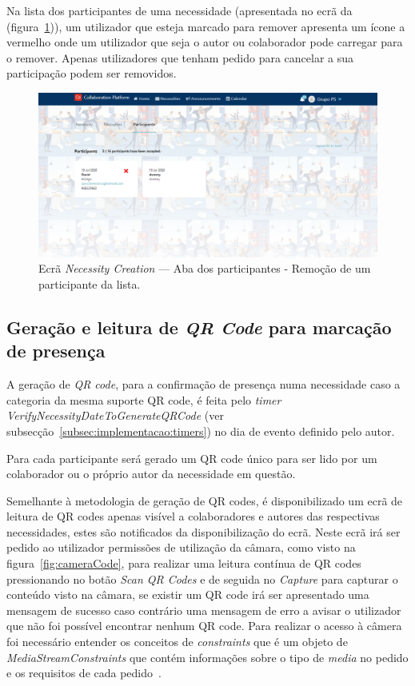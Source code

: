Na lista dos participantes de uma necessidade (apresentada no ecrã da (figura~\ref{fig:participants_removal2})), um utilizador que esteja marcado para remover apresenta um ícone a vermelho onde um utilizador que seja o autor ou colaborador pode carregar para o remover. 
Apenas utilizadores que tenham pedido para cancelar a sua participação podem ser removidos.

\begin{figure}[H]
  \centering 
  \includegraphics[scale=0.4]{figures/Participants_removal2.png}
  \caption{Ecrã \textit{Necessity Creation} --- Aba dos participantes - Remoção de um participante da lista.}\label{fig:participants_removal2}
\end{figure}


\newpage


\subsection{Geração e leitura de \textit{QR Code} para marcação de presença}\label{subsec:implementacao:qrcode}

A geração de \textit{QR code}, para a confirmação de presença numa necessidade caso a categoria da mesma suporte QR code,
 é feita pelo \textit{timer VerifyNecessityDateToGenerateQRCode} (ver subsecção~\ref{subsec:implementacao:timers}) no dia de evento definido pelo autor. 
\par
 Para cada participante será gerado um QR code único para ser lido por um colaborador ou o próprio autor da necessidade em questão.
\par
Semelhante à metodologia de geração de QR codes, é disponibilizado um ecrã de leitura de QR codes apenas visível a colaboradores e autores das respectivas necessidades, estes são notificados da disponibilização do ecrã.
Neste ecrã irá ser pedido ao utilizador permissões de utilização da câmara, como visto na figura~\ref{fig:cameraCode}, para realizar uma leitura contínua de QR codes pressionando no botão \textit{Scan QR Codes} e de seguida no \textit{Capture} para capturar o conteúdo visto na câmara, se existir um QR code irá ser apresentado uma mensagem de sucesso caso contrário uma mensagem de erro a avisar o utilizador que não foi possível encontrar nenhum QR code.
Para realizar o acesso à câmera foi necessário entender os conceitos de \textit{constraints} que é um objeto de \textit{MediaStreamConstraints} que contém informações sobre o tipo de \textit{media} no pedido e os requisitos de cada pedido~\cite{mediastreamconstraints}.

